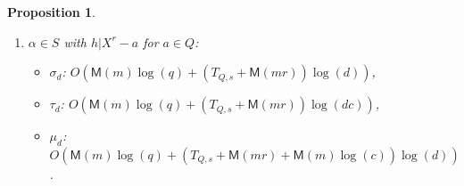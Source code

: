 \documentclass{mcom-l}
\theoremstyle{plain}
\newtheorem{proposition}[theorem]{Proposition}
\theoremstyle{definition}
\newcommand{\MM}{\ensuremath{\mathsf{M}}}
\begin{document}
\begin{proposition}
\begin{enumerate}[label=\textbf{Case~\theenumi.},leftmargin=*, align=left]
\begin{itemize}
\item
$\sigma_d$: $O((\MM(m)+\MM(s))\log(q) + (T_{Q,s}+T_{Q',m})\log(d)$,
\item
$\tau_d$: $O((\MM(m)+\MM(s))\log(q) + (T_{Q,s}+T_{Q',m})\log(d c))$,
\item
$\mu_d$: $O((\MM(m)+\MM(s))\log(q) + (T_{Q,s}+T_{Q',m} + (m\MM(s)+s\MM(m))\log(c))\log(d))$;
\end{itemize}
\item $\alpha \in S$ with $h | X^r - a$ for $a \in Q$:
\begin{itemize}
\item
$\sigma_d$: $O(\MM(m)\log(q) + (T_{Q,s}+ \MM(mr))\log(d))$,
\item
$\tau_d$: $O(\MM(m)\log(q) + (T_{Q,s} + \MM(mr))\log(d c))$,
\item
$\mu_d$: $O(\MM(m)\log(q) + (T_{Q,s} + \MM(mr) + \MM(m)\log(c))\log(d))$.
\end{itemize}
\end{enumerate}
\end{proposition}
\end{document}
